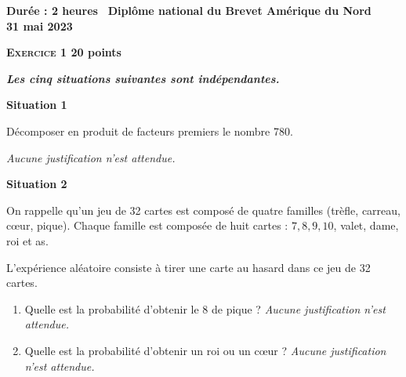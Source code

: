 \documentclass[11pt]{article}
\begin{document}
 
\hypertarget{AmeriqueduNord}{}
\label{AmeriqueduNord}

	\begin{center}\textbf{Durée : 2 heures}
{\Large\textbf{\decofourleft~Diplôme national du Brevet
Amérique du Nord~\decofourright}}\\[7pt]
{\Large \textbf{31 mai 2023}}

%
%
%
%
\end{center}

\vspace{0,5cm}

\textbf{{\large \textsc{Exercice 1}} \hfill 20 points}

\medskip
\emph{\textbf{Les cinq situations suivantes sont indépendantes.}}

\bigskip

\textbf{Situation 1}

Décomposer en produit de facteurs premiers le nombre 780.

\emph{Aucune justification n'est attendue.}

\bigskip

\textbf{Situation 2}

On rappelle qu'un jeu de 32 cartes est composé de quatre familles (trèfle, carreau, cœur, pique). Chaque famille est composée de huit cartes : $7,8,9,10$, valet, dame, roi et as.

L'expérience aléatoire consiste à tirer une carte au hasard dans ce jeu de 32 cartes.

\begin{enumerate}
	\item Quelle est la probabilité d'obtenir le 8 de pique ? \emph{Aucune justification n'est attendue.}
	\item Quelle est la probabilité d'obtenir un roi ou un cœur ? \emph{Aucune justification n'est attendue.}
\end{enumerate}
\end{document}
